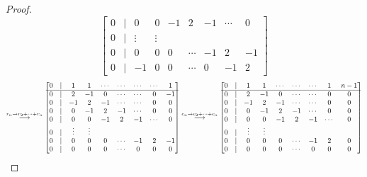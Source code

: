 \documentclass[11pt,reqno]{amsart}
\newcommand\scalemath[2]{\scalebox{#1}{\mbox{\ensuremath{\displaystyle #2}}}}
\theoremstyle{definition}
\theoremstyle{plain}
\begin{document}
\begin{proof}
\[{\begin{bmatrix}
	0 & | & 0 & 0 & - 1& 2 & -1 & \cdots & 0 \\
	0 & | & \vdots & \vdots \\
	0 & | & 0 & 0 & 0 & \cdots & -1& 2 & -1 \\
	0 & | & -1 & 0 & 0 & \cdots& 0 & -1 & 2 
\end{bmatrix} }
\]
\vspace{0.2cm}
\[
\scalemath{0.85}{ \stackrel{r_n \to r_2 + \cdots + r_{n}}\longrightarrow
\begin{bmatrix}
	0 & | & 1 & 1 & \cdots & \cdots & \cdots & \cdots & 1 \\
	\hline
	0 & | & 2 & -1 & 0 & \cdots & \cdots & 0 & -1 \\
	0 & | & - 1& 2 & -1 & \cdots & \cdots & 0 & 0 \\
	0 & | & 0 & - 1& 2 & -1 & \cdots & 0 & 0 \\
	0 & | & 0 & 0 & - 1& 2 & -1 & \cdots & 0 \\
	0 & | & \vdots & \vdots \\
	0 & | & 0 & 0 & 0 & \cdots & -1& 2 & -1 \\
	0 & | & 0 & 0 & 0 & \cdots& 0 & 0 & 0
\end{bmatrix}
\stackrel{c_n \to c_2 + \cdots + c_{n}}\longrightarrow
\begin{bmatrix}
	0 & | & 1 & 1 & \cdots & \cdots & \cdots & 1 & n-1 \\
	\hline
	0 & | & 2 & -1 & 0 & \cdots & \cdots & 0 & 0 \\
	0 & | & - 1& 2 & -1 & \cdots & \cdots & 0 & 0 \\
	0 & | & 0 & - 1& 2 & -1 & \cdots & 0 & 0 \\
	0 & | & 0 & 0 & - 1& 2 & -1 & \cdots & 0 \\
	0 & | & \vdots & \vdots \\
	0 & | & 0 & 0 & 0 & \cdots & -1& 2 & 0 \\
	0 & | & 0 & 0 & 0 & \cdots& 0 & 0 & 0
\end{bmatrix} }
\]

\end{proof}
\end{document}
